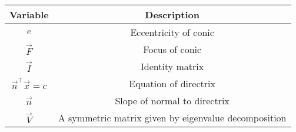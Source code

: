 \begin{tabular}[12pt]{ |c| c|}
    \hline
    \textbf{Variable} & \textbf{Description}\\ 
    \hline
	$e$ & Eccentricity of conic\\
	\hline
	$\vec{F}$ & Focus of conic\\
	\hline
	$\vec{I}$ & Identity matrix\\
	\hline
	$\vec{n}^{\top}\vec{x}=c$ & Equation of directrix\\
	\hline
	$\vec{n}$ & Slope of normal to directrix\\
	\hline
	$\vec{V}$ & A symmetric matrix given by eigenvalue decomposition\\
	\hline
\end{tabular}